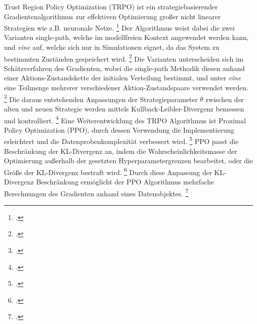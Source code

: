 Trust Region Policy Optimization (TRPO) ist ein strategiebasierender Gradientenalgorithmus zur effektiven Optimierung großer nicht linearer Strategien wie z.B. neuronale Netze. \footcite[Vgl.][S. 1]{Schulman.2015}
Der Algorithmus weist dabei die zwei Varianten single-path, welche im modellfreien Kontext angewendet werden kann, und \textit{vine} auf, welche sich nur in Simulationen eignet, da das System zu bestimmten Zuständen gespeichert wird. \footcite[Vgl.][S. 1]{Schulman.2015}
Die Varianten unterscheiden sich im Schätzverfahren des Gradienten, wobei die single-path Methodik diesen anhand einer Aktions-Zustandskette der initialen Verteilung bestimmt, und unter \textit{vine} eine Teilmenge mehrerer verschiedener Aktion-Zustandspaare verwendet werden. \footcite[Vgl.][S. 4]{Schulman.2015}
Die daraus entstehenden Anpassungen der Strategieparameter $\theta$ zwischen der alten und neuen Strategie werden mittels Kullback-Leibler-Divergenz bemessen und kontrolliert. \footcite[Vgl.][S. 4]{Huang.2017}
Eine Weiterentwicklung des TRPO Algorithmus ist Proximal Policy Optimization (PPO), durch dessen Verwendung die Implementierung erleichtert und die Datenprobenkomplexität verbessert wird. \footcite[Vgl.][S. 1]{Schulman.2017}
PPO passt die Beschränkung der KL-Divergenz an, indem die Wahrscheinlichkeitsmasse der Optimierung außerhalb der gesetzten Hyperparametergrenzen bearbeitet, oder die Größe der KL-Divergenz bestraft wird. \footcite[Vgl.][S. 3f.]{Schulman.2017}
Durch diese Anpassung der KL-Divergenz Beschränkung ermöglicht der PPO Algorithmus mehrfache Berechnungen des Gradienten anhand eines Datenobjektes. \footcite[Vgl.][S. 4]{Schulman.2017}


